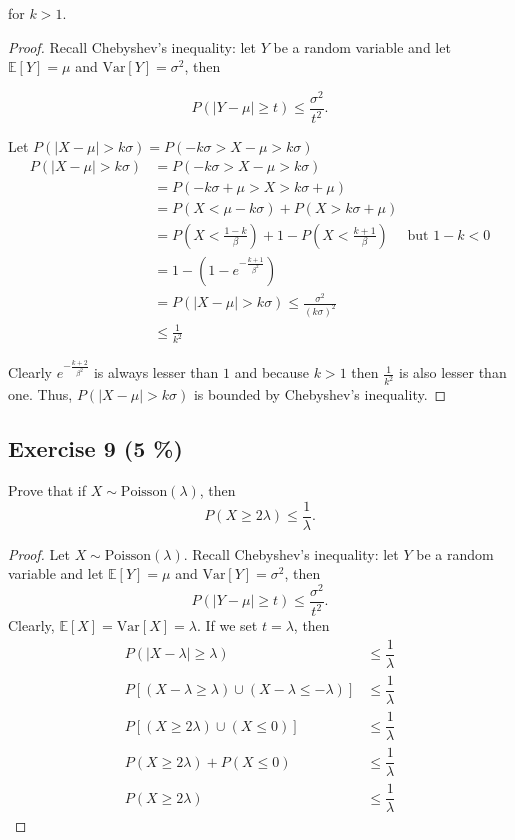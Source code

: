 \documentclass[11pt]{article}
\theoremstyle{definition}
\theoremstyle{remark}
\theoremstyle{remark}
\newcommand{\E}[1]{\mathbb{E}\left[#1 \right]}
\newcommand{\V}[1]{\mathrm{Var}\left[#1 \right]}
\begin{document}
for $k>1$.

\begin{proof}
  Recall Chebyshev's inequality: let $Y$ be a random variable and let
  $\E{Y}=\mu$ and $\V{Y}=\sigma^2$, then

\[
  P(|Y-\mu|\geq t)\leq\dfrac{\sigma^2}{t^2}.
\]

Let $P(|X-\mu|>k \sigma)=P(-k \sigma>X-\mu>k \sigma)$
\begin{align*}
  P(|X-\mu|>k \sigma) &=P(-k \sigma>X-\mu>k \sigma) \\
                      &=P(-k \sigma+\mu>X>k \sigma+\mu) \\
                      &=P(X<\mu-k \sigma)+P(X>k \sigma+\mu) \\
                      &=P\left(X<\frac{1-k}{\beta}\right)+1-P\left(X<\frac{k+1}{\beta}\right) \quad \text { but } 1-k<0\\
                      &=1-\left(1-e^{-\frac{k+1}{\beta^{2}}}\right) \\
                      &=P(|X-\mu|>k \sigma) \leq \frac{\sigma^{2}}{(k \sigma)^{2}} \\
                      &\leq \frac{1}{k^{2}}
\end{align*}

Clearly $e^{-\frac{k+2}{\beta^{2}}}$ is always lesser than $1$ and
because $k>1$ then $\frac{1}{k^{2}}$ is also lesser than one. Thus,
$P(|X-\mu|>k \sigma)$ is bounded by Chebyshev's inequality.
\end{proof}


\subsection*{Exercise 9 (5 \%)}
Prove that if $X\sim \mathrm{Poisson}(\lambda)$, then
\[
  P(X\geq 2\lambda)\leq \dfrac{1}{\lambda}.
\]
\begin{proof}
  Let $X\sim \mathrm{Poisson}(\lambda)$. Recall Chebyshev's
  inequality: let $Y$ be a random variable and let $\E{Y}=\mu$ and
  $\V{Y}=\sigma^2$, then
\[
  P(|Y-\mu|\geq t)\leq\dfrac{\sigma^2}{t^2}.
\]
Clearly, $\E{X}=\V{X}=\lambda$. If we set $t=\lambda$, then
\[
\begin{split}
  P(|X-\lambda|\geq\lambda)&\leq\dfrac{1}{\lambda}\\
  P\left[(X-\lambda\geq\lambda)\cup(X-\lambda\leq-\lambda)\right]&\leq\dfrac{1}{\lambda}\\
  P\left[(X\geq2\lambda)\cup(X\leq0)\right]&\leq\dfrac{1}{\lambda}\\
  P(X\geq2\lambda)+P(X\leq0)&\leq\dfrac{1}{\lambda}\\
  P(X\geq 2\lambda)&\leq \dfrac{1}{\lambda}
\end{split}
\]
\end{proof}
\end{document}
